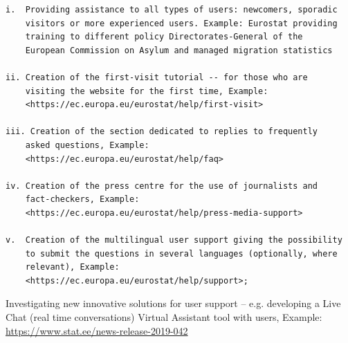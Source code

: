 \documentclass[
]{article}
\begin{document}
\begin{verbatim}
i.  Providing assistance to all types of users: newcomers, sporadic
    visitors or more experienced users. Example: Eurostat providing
    training to different policy Directorates-General of the
    European Commission on Asylum and managed migration statistics

ii. Creation of the first-visit tutorial -- for those who are
    visiting the website for the first time, Example:
    <https://ec.europa.eu/eurostat/help/first-visit>

iii. Creation of the section dedicated to replies to frequently
    asked questions, Example:
    <https://ec.europa.eu/eurostat/help/faq>

iv. Creation of the press centre for the use of journalists and
    fact-checkers, Example:
    <https://ec.europa.eu/eurostat/help/press-media-support>

v.  Creation of the multilingual user support giving the possibility
    to submit the questions in several languages (optionally, where
    relevant), Example:
    <https://ec.europa.eu/eurostat/help/support>;
\end{verbatim}

Investigating new innovative solutions for user support -- e.g.
developing a Live Chat (real time conversations) Virtual Assistant tool
with users, Example: \url{https://www.stat.ee/news-release-2019-042}
\end{document}
